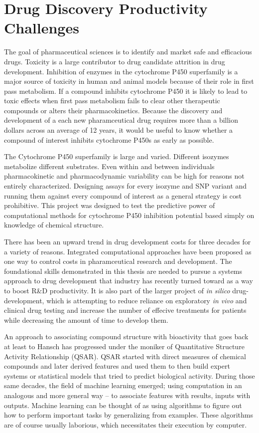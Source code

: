 
\section{Drug Discovery Productivity Challenges}

The goal of pharmaceutical sciences is to identify and market safe and efficacious drugs. Toxicity is a large contributor to drug candidate attrition in drug development. Inhibition of enzymes in the cytochrome P450 superfamily is a major source of toxicity in human and animal models because of their role in first pass metabolism. If a compound inhibits cytochrome P450 it is likely to lead to toxic effects when first pass metabolism fails to clear other therapeutic compounds or alters their pharmacokinetics. Because the discovery and development of a each new pharamceutical drug requires more than a billion dollars across an average of 12 years, it would be useful to know whether a compound of interest inhibits cytochrome P450s as early as possible.

The Cytochrome P450 superfamily is large and varied. Different isozymes metabolize different substrates. Even within and between individuals pharmacokinetic and pharmacodynamic variability can be high for reasons not entirely characterized. Designing assays for every isozyme and SNP variant and running them against every compound of interest as a general strategy is cost prohibitive. This project was designed to test the predictive power of computational methods for cytochrome P450 inhibition potential based simply on knowledge of chemical structure.

There has been an upward trend in drug development costs for three decades for a variety of reasons. Integrated computational approaches have been proposed as one way to control costs in pharamceutical research and development. \cite{Visser2014} The foundational skills demonstrated in this thesis are needed to pursue a systems approach to drug development that industry has recently turned toward as a way to boost R\&D productivity. \cite{Berg2014} It is also part of the larger project of \textit{in silico} drug-development, which is attempting to reduce reliance on exploratory \textit{in vivo} and clinical drug testing and increase the number of effecive treatments for patients while decreasing the amount of time to develop them.


An approach to associating compound structure with bioactivity that goes back at least to Hansch \cite{Hansch1964} has progressed under the moniker of Quantitative Structure Activity Relationship (QSAR). QSAR started with direct measures of chemical compounds and later derived features and used them to then build expert systems or statistical models that tried to predict biological activity. During those same decades, the field of machine learning emerged; using computation in an analogous and more general way -- to associate features with results, inputs with outputs. Machine learning can be thought of as using algorithms to figure out how to perform important tasks by generalizing from examples. These algorithms are of course usually laborious, which necessitates their execution by computer.


